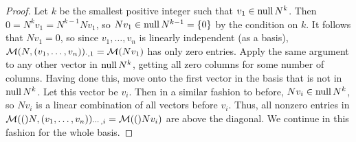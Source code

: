 \documentclass[../main.tex]{subfiles}
\begin{document}
\begin{itemize}
\begin{theorem}
\begin{proof}
            Let $k$ be the smallest positive integer such that $v_1\in\operatorname{null} N^k$. Then $0=N^kv_1=N^{k-1}Nv_1$, so $Nv_1\in\operatorname{null} N^{k-1}=\{0\}$ by the condition on $k$. It follows that $Nv_1=0$, so since $v_1,\dots,v_n$ is linearly independent (as a basis), $\mathcal{M}(N,(v_1,\dots,v_n))_{\cdot,1}=\mathcal{M}(Nv_1)$ has only zero entries. Apply the same argument to any other vector in $\operatorname{null} N^k$, getting all zero columns for some number of columns. Having done this, move onto the first vector in the basis that is not in $\operatorname{null} N^k$. Let this vector be $v_i$. Then in a similar fashion to before, $Nv_i\in\operatorname{null} N^k$, so $Nv_i$ is a linear combination of all vectors before $v_i$. Thus, all nonzero entries in $\mathcal{M}(()N,(v_1,\dots,v_n))_{\cdots,i}=\mathcal{M}(()Nv_i)$ are above the diagonal. We continue in this fashion for the whole basis.
        \end{proof}
    \end{theorem}
\end{itemize}
\end{document}
